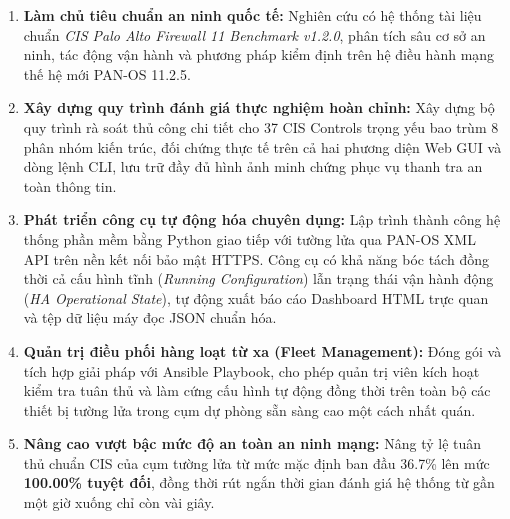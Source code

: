 \documentclass[12pt,a4paper]{article}
\begin{document}
\begin{enumerate}
    \item \textbf{Làm chủ tiêu chuẩn an ninh quốc tế:} Nghiên cứu có hệ thống tài liệu chuẩn \textit{CIS Palo Alto Firewall 11 Benchmark v1.2.0}, phân tích sâu cơ sở an ninh, tác động vận hành và phương pháp kiểm định trên hệ điều hành mạng thế hệ mới PAN-OS 11.2.5.
    \item \textbf{Xây dựng quy trình đánh giá thực nghiệm hoàn chỉnh:} Xây dựng bộ quy trình rà soát thủ công chi tiết cho 37 CIS Controls trọng yếu bao trùm 8 phân nhóm kiến trúc, đối chứng thực tế trên cả hai phương diện Web GUI và dòng lệnh CLI, lưu trữ đầy đủ hình ảnh minh chứng phục vụ thanh tra an toàn thông tin.
    \item \textbf{Phát triển công cụ tự động hóa chuyên dụng:} Lập trình thành công hệ thống phần mềm bằng Python giao tiếp với tường lửa qua PAN-OS XML API trên nền kết nối bảo mật HTTPS. Công cụ có khả năng bóc tách đồng thời cả cấu hình tĩnh (\textit{Running Configuration}) lẫn trạng thái vận hành động (\textit{HA Operational State}), tự động xuất báo cáo Dashboard HTML trực quan và tệp dữ liệu máy đọc JSON chuẩn hóa.
    \item \textbf{Quản trị điều phối hàng loạt từ xa (Fleet Management):} Đóng gói và tích hợp giải pháp với Ansible Playbook, cho phép quản trị viên kích hoạt kiểm tra tuân thủ và làm cứng cấu hình tự động đồng thời trên toàn bộ các thiết bị tường lửa trong cụm dự phòng sẵn sàng cao một cách nhất quán.
    \item \textbf{Nâng cao vượt bậc mức độ an toàn an ninh mạng:} Nâng tỷ lệ tuân thủ chuẩn CIS của cụm tường lửa từ mức mặc định ban đầu 36.7\% lên mức \textbf{100.00\% tuyệt đối}, đồng thời rút ngắn thời gian đánh giá hệ thống từ gần một giờ xuống chỉ còn vài giây.
\end{enumerate}
\end{document}
